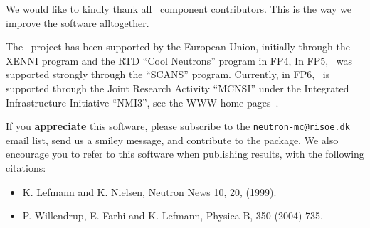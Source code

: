 We would like to kindly thank all \MCS\ component contributors. This is the way we improve the software alltogether.

The \MCS\ project has been supported by the European Union, initially
through the XENNI program and the RTD ``Cool Neutrons'' program in FP4,
In FP5, \MCS\ was supported strongly through the
``SCANS'' program.
Currently, in FP6, \MCS\ is supported through the Joint Research Activity
``MCNSI'' under the Integrated Infrastructure Initiative ``NMI3'', see
the WWW home pages~\cite{mcnsi_webpage,nmi3_webpage}.

If you {\bf appreciate} this software, please subscribe to the \verb+neutron-mc@risoe.dk+ email list, send us a smiley message, and contribute to the package. We also encourage you to refer to this software when publishing results, with the following citations:
\begin{itemize}
\item{K. Lefmann and K. Nielsen, Neutron News 10, 20, (1999).}
\item{P. Willendrup, E. Farhi and K. Lefmann, Physica B, 350 (2004) 735.}
\end{itemize}






